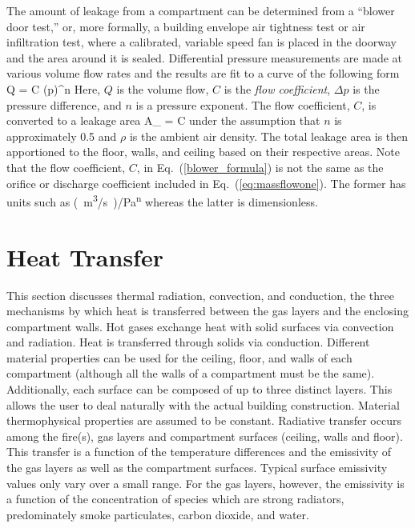 \documentclass[12pt,twoside]{book}
\begin{document}
The amount of leakage from a compartment can be determined from a ``blower door test,'' or, more formally, a building envelope air tightness test or air infiltration test, where a calibrated, variable speed fan is placed in the doorway and the area around it is sealed. Differential pressure measurements are made at various volume flow rates and the results are fit to a curve of the following form
\be
  Q = C (\Delta p)^n   \label{blower_formula}
\ee
Here, $Q$ is the volume flow, $C$ is the \textit{flow coefficient}, $\Delta p$ is the pressure difference, and $n$ is a pressure exponent. The flow coefficient, $C$, is converted to a leakage area
\be
  A_{} = C 
\ee
under the assumption that $n$ is approximately 0.5 and $\rho$ is the ambient air density. The total leakage area is then apportioned to the floor, walls, and ceiling based on their respective areas. Note that the flow coefficient, $C$, in Eq.~(\ref{blower_formula}) is not the same as the orifice or discharge coefficient included in Eq.~(\ref{eq:massflowone}). The former has units such as \unit{(m^3/s)/Pa^n} whereas the latter is dimensionless.






\chapter{Heat Transfer}
\label{chap:heat_transfer}

This section discusses thermal radiation, convection, and conduction, the three mechanisms by which heat is transferred between the gas layers and the enclosing compartment walls. Hot gases exchange heat with solid surfaces via convection and radiation. Heat is transferred through solids via conduction. Different material properties can be used for the ceiling, floor, and walls of each compartment (although all the walls of a compartment must be the same).  Additionally, each surface can be composed of up to three distinct layers.  This allows the user to deal naturally with the actual building construction.  Material thermophysical properties are assumed to be constant. Radiative transfer occurs among the fire(s), gas layers and compartment surfaces (ceiling, walls and floor).  This transfer is a function of the temperature differences and the emissivity of the gas layers as well as the compartment surfaces.  Typical surface emissivity values only vary over a small range.  For the gas layers, however, the emissivity is a function of the concentration of species which are strong radiators, predominately smoke particulates, carbon dioxide, and water.
\end{document}
